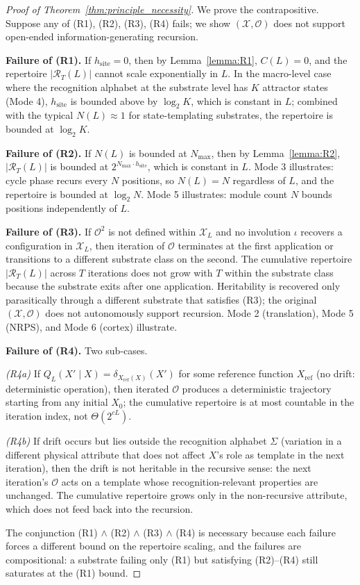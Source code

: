 \documentclass[11pt]{article}
\theoremstyle{plain}
\theoremstyle{definition}
\newcommand{\Xset}{\mathcal{X}}
\newcommand{\Op}{\mathcal{O}}
\begin{document}
\begin{proof}[Proof of Theorem~\ref{thm:principle_necessity}]
We prove the contrapositive. Suppose any of (R1), (R2), (R3), (R4) fails; we show $(\Xset, \Op)$ does not support open-ended information-generating recursion.

\textbf{Failure of (R1).} If $h_{\mathrm{site}} = 0$, then by Lemma~\ref{lemma:R1}, $C(L) = 0$, and the repertoire $|\mathcal{R}_T(L)|$ cannot scale exponentially in $L$. In the macro-level case where the recognition alphabet at the substrate level has $K$ attractor states (Mode 4), $h_{\mathrm{site}}$ is bounded above by $\log_2 K$, which is constant in $L$; combined with the typical $N(L) \approx 1$ for state-templating substrates, the repertoire is bounded at $\log_2 K$.

\textbf{Failure of (R2).} If $N(L)$ is bounded at $N_{\max}$, then by Lemma~\ref{lemma:R2}, $|\mathcal{R}_T(L)|$ is bounded at $2^{N_{\max} \cdot h_{\mathrm{site}}}$, which is constant in $L$. Mode 3 illustrates: cycle phase recurs every $N$ positions, so $N(L) = N$ regardless of $L$, and the repertoire is bounded at $\log_2 N$. Mode 5 illustrates: module count $N$ bounds positions independently of $L$.

\textbf{Failure of (R3).} If $\Op^2$ is not defined within $\Xset_L$ and no involution $\iota$ recovers a configuration in $\Xset_L$, then iteration of $\Op$ terminates at the first application or transitions to a different substrate class on the second. The cumulative repertoire $|\mathcal{R}_T(L)|$ across $T$ iterations does not grow with $T$ within the substrate class because the substrate exits after one application. Heritability is recovered only parasitically through a different substrate that satisfies (R3); the original $(\Xset, \Op)$ does not autonomously support recursion. Mode 2 (translation), Mode 5 (NRPS), and Mode 6 (cortex) illustrate.

\textbf{Failure of (R4).} Two sub-cases.

\emph{(R4a)} If $Q_L(X' \mid X) = \delta_{X_{\mathrm{ref}}(X)}(X')$ for some reference function $X_{\mathrm{ref}}$ (no drift: deterministic operation), then iterated $\Op$ produces a deterministic trajectory starting from any initial $X_0$; the cumulative repertoire is at most countable in the iteration index, not $\Theta(2^{cL})$.

\emph{(R4b)} If drift occurs but lies outside the recognition alphabet $\Sigma$ (variation in a different physical attribute that does not affect $X$'s role as template in the next iteration), then the drift is not heritable in the recursive sense: the next iteration's $\Op$ acts on a template whose recognition-relevant properties are unchanged. The cumulative repertoire grows only in the non-recursive attribute, which does not feed back into the recursion.

The conjunction (R1) $\wedge$ (R2) $\wedge$ (R3) $\wedge$ (R4) is necessary because each failure forces a different bound on the repertoire scaling, and the failures are compositional: a substrate failing only (R1) but satisfying (R2)--(R4) still saturates at the (R1) bound.
\end{proof}
\end{document}
